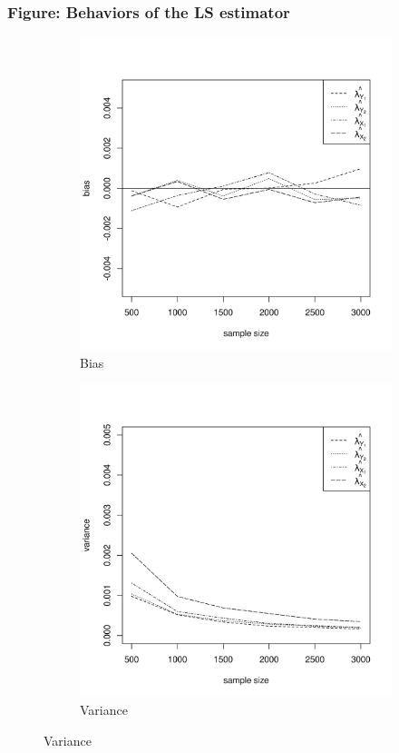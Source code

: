 \documentclass{beamer}
\begin{document}
	\begin{frame}[t]\frametitle{Figure: Behaviors of the LS estimator}
		\begin{figure}[t]
	    \centering
	    \begin{subfigure}[b]{0.45\textwidth}
	      \centering
	      \includegraphics[width=\textwidth]{Fig/bias_uneq_discrim_high.png}
	      \caption{Bias}
	    \end{subfigure}
	    \begin{subfigure}[b]{0.45\textwidth}
	      \centering
	      \includegraphics[width=\textwidth]{Fig/var_uneq_discrim_high.png}
	      \caption{Variance}
	    \end{subfigure}
	  \end{figure}
	\end{frame}
\end{document}

